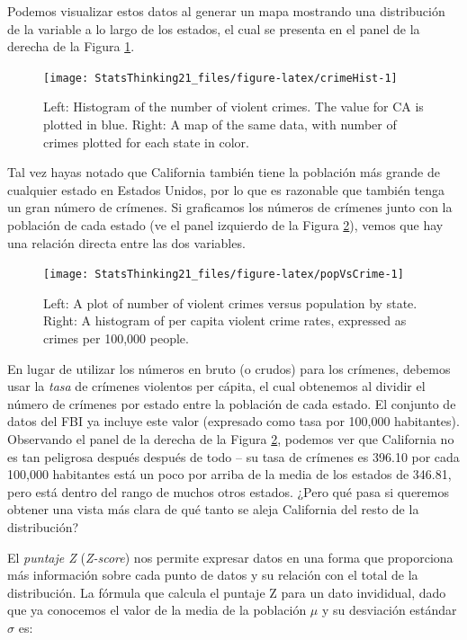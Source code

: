 \documentclass[
  12pt,
]{book}
\begin{document}
Podemos visualizar estos datos al generar un mapa mostrando una distribución de la variable a lo largo de los estados, el cual se presenta en el panel de la derecha de la Figura \ref{fig:crimeHist}.

\begin{figure}
\texttt{[image: StatsThinking21\_files/figure-latex/crimeHist-1]} \caption{Left: Histogram of the number of violent crimes.  The value for CA is plotted in blue. Right: A map of the same data, with number of crimes plotted for each state in color.}\label{fig:crimeHist}
\end{figure}

Tal vez hayas notado que California también tiene la población más grande de cualquier estado en Estados Unidos, por lo que es razonable que también tenga un gran número de crímenes. Si graficamos los números de crímenes junto con la población de cada estado (ve el panel izquierdo de la Figura \ref{fig:popVsCrime}), vemos que hay una relación directa entre las dos variables.

\begin{figure}
\texttt{[image: StatsThinking21\_files/figure-latex/popVsCrime-1]} \caption{Left: A plot of number of violent crimes versus population by state. Right: A histogram of per capita violent crime rates, expressed as crimes per 100,000 people.}\label{fig:popVsCrime}
\end{figure}

En lugar de utilizar los números en bruto (o crudos) para los crímenes, debemos usar la \emph{tasa} de crímenes violentos per cápita, el cual obtenemos al dividir el número de crímenes por estado entre la población de cada estado. El conjunto de datos del FBI ya incluye este valor (expresado como tasa por 100,000 habitantes). Observando el panel de la derecha de la Figura \ref{fig:popVsCrime}, podemos ver que California no es tan peligrosa después después de todo -- su tasa de crímenes es 396.10 por cada 100,000 habitantes está un poco por arriba de la media de los estados de 346.81, pero está dentro del rango de muchos otros estados. ¿Pero qué pasa si queremos obtener una vista más clara de qué tanto se aleja California del resto de la distribución?

El \emph{puntaje Z} (\emph{Z-score}) nos permite expresar datos en una forma que proporciona más información sobre cada punto de datos y su relación con el total de la distribución. La fórmula que calcula el puntaje Z para un dato invididual, dado que ya conocemos el valor de la media de la población \(\mu\) y su desviación estándar \(\sigma\) es:
\end{document}
